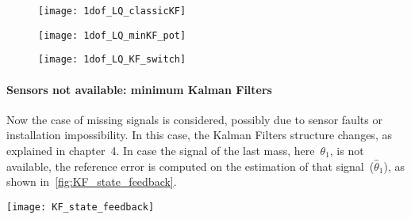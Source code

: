 \begin{figure*}
	\centering
	\begin{subfigure}{0.45\columnwidth}
		\texttt{[image: 1dof\_LQ\_classicKF]}
		\label{fig:1dof_LQ_classicKF}
	\end{subfigure}
	\begin{subfigure}{0.45\columnwidth}
		\texttt{[image: 1dof\_LQ\_minKF\_pot]}
		\label{fig:1dof_LQ_minKF_pot}
	\end{subfigure}
	\newline
	\begin{subfigure}{\columnwidth}
		\centering
		\texttt{[image: 1dof\_LQ\_KF\_switch]}
		\label{fig:1dof_LQ_KF_switch}
	\end{subfigure}
	\caption{LQG with different sensors available, \onedof\ case}
\end{figure*}

\paragraph{Sensors not available: minimum Kalman Filters}

Now the case of missing signals is considered, possibly due to sensor faults or installation impossibility. In this case, the Kalman Filters structure changes, as explained in chapter~4. In case the signal of the last mass, here~$\theta_1$, is not available, the reference error is computed on the estimation of that signal~($\hat\theta_1$), as shown in~\cref{fig:KF_state_feedback}. \\

\begin{figure*}
	\centering
	\texttt{[image: KF\_state\_feedback]}
	\caption{State measurement not available: estimated state feedback, \onedof\ case}
	\label{fig:KF_state_feedback}
\end{figure*}

